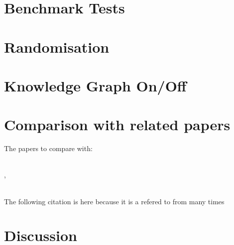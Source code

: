 \newpage
\section{Benchmark Tests}%
\label{sec:benchmark_tests}

\section{Randomisation}%
\label{sec:randomisation}


\section{Knowledge Graph On/Off}%
\label{sec:kgraph_on_off}

\section{Comparison with related papers}%
\label{sec:compare_with_related_papers}

The papers to compare with:\newline

\\

\cite{sabbaghnovin_model_2021}, 


\\
\cite{novin_dynamic_2018}
The following \cite{novin_dynamic_2018} citation is here because it is a refered to from \cite{sabbaghnovin_model_2021} many times




\section{Discussion}%
\label{sec:discussion}
